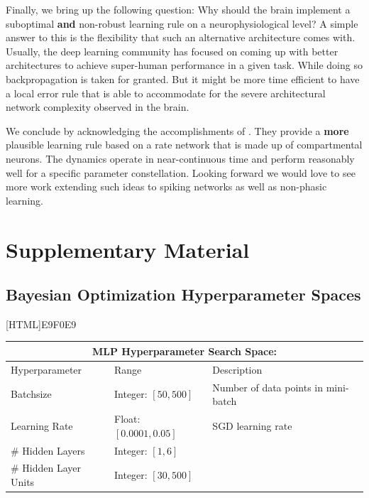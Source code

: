 \documentclass[colorinlistoftodos]{article}
\theoremstyle{definition}
\begin{document}
Finally, we bring up the following question: Why should the brain implement a suboptimal \textbf{and} non-robust learning rule on a neurophysiological level? A simple answer to this is the flexibility that such an alternative architecture comes with. 
Usually, the deep learning community has focused on coming up with better architectures to achieve super-human performance in a given task. While doing so backpropagation is taken for granted. But it might be more time efficient to have a local error rule that is able to accommodate for the severe architectural network complexity observed in the brain.

We conclude by acknowledging the accomplishments of \citet{guerguiev2017}. They provide a \textbf{more} plausible learning rule based on a rate network that is made up of compartmental neurons. The dynamics operate in near-continuous time and perform reasonably well for a specific parameter constellation.
Looking forward we would love to see more work extending such ideas to spiking networks as well as non-phasic learning. 

\setlength{\bibsep}{4pt plus 0.3ex}

{\footnotesize }

\section*{Supplementary Material}

\subsection*{Bayesian Optimization Hyperparameter Spaces}

[HTML]{E9F0E9}{\parbox{\textwidth}{%
\small{
\begin{center}
\begin{tabular}{ |p{3cm}||p{3cm}|p{6cm}| }
 \hline
 \multicolumn{3}{|c|}{\textbf{MLP Hyperparameter Search Space:}} \\
 \hline
Hyperparameter & Range & Description\\
 \hline
 Batchsize & Integer: $[50, 500]$ & Number of data points in mini-batch\\
 Learning Rate & Float: $[0.0001, 0.05]$ & SGD learning rate\\
 \# Hidden Layers & Integer: $[1, 6]$ & \\ 
 \# Hidden Layer Units & Integer: $[30, 500]$ & \\ 
 \hline
\end{tabular}	
\end{center}
}}}
\end{document}
